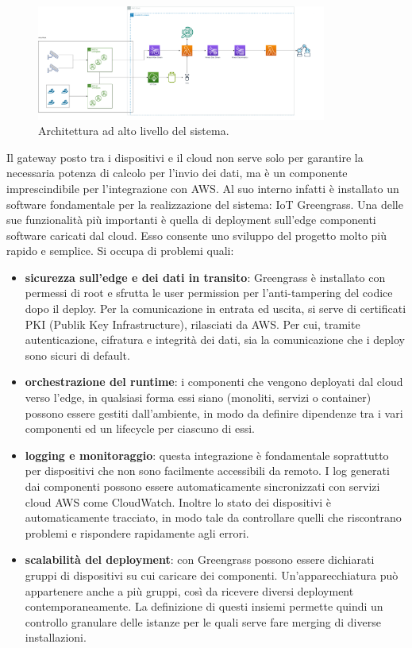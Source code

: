 \begin{figure}[htbp]
    \centering
    \includegraphics[width=0.85\textwidth]{figures/architettura.png}
    \caption{Architettura ad alto livello del sistema.} 
    \label{fig:architettura}
\end{figure}
 

Il gateway posto tra i dispositivi e il cloud non serve solo per garantire la necessaria potenza di calcolo per l’invio dei dati, ma è un componente imprescindibile per l’integrazione con AWS. Al suo interno infatti è installato un software fondamentale per la realizzazione del sistema: IoT Greengrass. Una delle sue funzionalità più importanti è quella di deployment sull'edge componenti software caricati dal cloud. Esso consente uno sviluppo del progetto molto più rapido e semplice. Si occupa di problemi quali: 

\newpage
\begin{itemize}
	\item \textbf{sicurezza sull’edge e dei dati in transito}: Greengrass è installato con permessi di root e sfrutta le user permission per l’anti-tampering del codice dopo il deploy. Per la comunicazione in entrata ed uscita, si serve di certificati PKI (Publik Key Infrastructure), rilasciati da AWS. Per cui, tramite autenticazione, cifratura e integrità dei dati, sia la comunicazione che i deploy sono sicuri di default.
	\item \textbf{orchestrazione del runtime}: i componenti che vengono deployati dal cloud verso l’edge, in qualsiasi forma essi siano (monoliti, servizi o container) possono essere gestiti dall’ambiente, in modo da definire dipendenze tra i vari componenti ed un lifecycle per ciascuno di essi.  
	\item \textbf{logging e monitoraggio}: questa integrazione è fondamentale soprattutto per dispositivi che non sono facilmente accessibili da remoto. I log generati dai componenti possono essere automaticamente sincronizzati con servizi cloud AWS come CloudWatch. Inoltre lo stato dei dispositivi è automaticamente tracciato, in modo tale da controllare quelli che riscontrano problemi e rispondere rapidamente agli errori.
	\item \textbf{scalabilità del deployment}: con Greengrass possono essere dichiarati gruppi di dispositivi su cui caricare dei componenti. Un'apparecchiatura può appartenere anche a più gruppi, così da ricevere diversi deployment contemporaneamente. La definizione di questi insiemi permette quindi un controllo granulare delle istanze per le quali serve fare merging di diverse installazioni.
\end{itemize}

